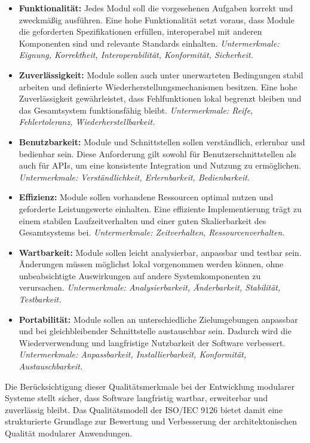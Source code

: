 \begin{itemize}
    \item \textbf{Funktionalität:}
    Jedes Modul soll die vorgesehenen Aufgaben korrekt und zweckmäßig ausführen.
    Eine hohe Funktionalität setzt voraus, dass Module die geforderten Spezifikationen erfüllen, interoperabel mit anderen Komponenten sind und relevante Standards einhalten.
    \emph{Untermerkmale: Eignung, Korrektheit, Interoperabilität, Konformität, Sicherheit.}

    \item \textbf{Zuverlässigkeit:}
    Module sollen auch unter unerwarteten Bedingungen stabil arbeiten und definierte Wiederherstellungsmechanismen besitzen.
    Eine hohe Zuverlässigkeit gewährleistet, dass Fehlfunktionen lokal begrenzt bleiben und das Gesamtsystem funktionsfähig bleibt.
    \emph{Untermerkmale: Reife, Fehlertoleranz, Wiederherstellbarkeit.}

    \item \textbf{Benutzbarkeit:}
    Module und Schnittstellen sollen verständlich, erlernbar und bedienbar sein.
    Diese Anforderung gilt sowohl für Benutzerschnittstellen als auch für APIs, um eine konsistente Integration und Nutzung zu ermöglichen.
    \emph{Untermerkmale: Verständlichkeit, Erlernbarkeit, Bedienbarkeit.}

    \item \textbf{Effizienz:}
    Module sollen vorhandene Ressourcen optimal nutzen und geforderte Leistungswerte einhalten.
    Eine effiziente Implementierung trägt zu einem stabilen Laufzeitverhalten und einer guten Skalierbarkeit des Gesamtsystems bei.
    \emph{Untermerkmale: Zeitverhalten, Ressourcenverhalten.}

    \item \textbf{Wartbarkeit:}
    Module sollen leicht analysierbar, anpassbar und testbar sein.
    Änderungen müssen möglichst lokal vorgenommen werden können, ohne unbeabsichtigte Auswirkungen auf andere Systemkomponenten zu verursachen.
    \emph{Untermerkmale: Analysierbarkeit, Änderbarkeit, Stabilität, Testbarkeit.}

    \item \textbf{Portabilität:}
    Module sollen an unterschiedliche Zielumgebungen anpassbar und bei gleichbleibender Schnittstelle austauschbar sein.
    Dadurch wird die Wiederverwendung und langfristige Nutzbarkeit der Software verbessert.
    \emph{Untermerkmale: Anpassbarkeit, Installierbarkeit, Konformität, Austauschbarkeit.}
\end{itemize}

Die Berücksichtigung dieser Qualitätsmerkmale bei der Entwicklung modularer Systeme stellt sicher, dass Software langfristig wartbar, erweiterbar und zuverlässig bleibt.
Das Qualitätsmodell der ISO/IEC 9126 bietet damit eine strukturierte Grundlage zur Bewertung und Verbesserung der architektonischen Qualität modularer Anwendungen. \cite{ISOIEC9126-1991}


\pagebreak